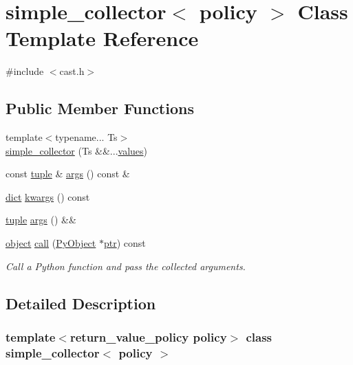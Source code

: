 \hypertarget{classsimple__collector}{}\section{simple\+\_\+collector$<$ policy $>$ Class Template Reference}
\label{classsimple__collector}


{\ttfamily \#include $<$cast.\+h$>$}

\subsection*{Public Member Functions}
\begin{DoxyCompactItemize}
\item 
{\footnotesize template$<$typename... Ts$>$ }\\\mbox{\hyperlink{classsimple__collector_a21c964eaf130362b6044709cec9c31cf}{simple\+\_\+collector}} (Ts \&\&...\mbox{\hyperlink{_s_d_l__opengl__glext_8h_a0aa8cf39c79d294b1d9f4daef5020bec}{values}})
\item 
const \mbox{\hyperlink{classtuple}{tuple}} \& \mbox{\hyperlink{classsimple__collector_a328467968ae3f57f561834780a631c36}{args}} () const \&
\item 
\mbox{\hyperlink{classdict}{dict}} \mbox{\hyperlink{classsimple__collector_a41400f1ddfad6849df25ef53f084762b}{kwargs}} () const
\item 
\mbox{\hyperlink{classtuple}{tuple}} \mbox{\hyperlink{classsimple__collector_aaa12c5a3e17b5d49003ba6beaa676906}{args}} () \&\&
\item 
\mbox{\hyperlink{classobject}{object}} \mbox{\hyperlink{classsimple__collector_aa5e692afd78c541e35034ff013d5ad1e}{call}} (\mbox{\hyperlink{_python27_2object_8h_aadc84ac7aed2cfa6f20c25f62bf3dac7}{Py\+Object}} $\ast$\mbox{\hyperlink{pystrtod_8h_a671b2e1a427060ad8b5362882ed58f5b}{ptr}}) const
\begin{DoxyCompactList}\small\item\em Call a Python function and pass the collected arguments. \end{DoxyCompactList}\end{DoxyCompactItemize}


\subsection{Detailed Description}
\subsubsection*{template$<$return\+\_\+value\+\_\+policy policy$>$\newline
class simple\+\_\+collector$<$ policy $>$}


